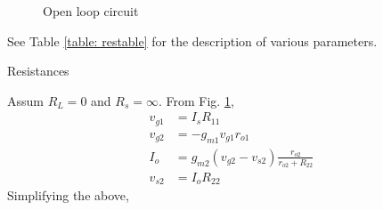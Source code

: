\begin{enumerate}[label=\arabic*.,ref=\theenumi]
\begin{figure}[!ht]
\begin{center}
		\resizebox{\columnwidth}{!}{}
	\end{center}
\caption{Open loop circuit}
\label{fig:ee18btech11038_Ackt}
\end{figure}
\solution See Table \ref{table: restable} for the description of various parameters.
%
\begin{table}[!ht]
\centering

\caption{Resistances}
\label{table: restable}
\end{table}
%
Assum $R_{L} = 0$ and $R_{s} = \infty$. 
From Fig. \ref{fig:ee18btech11038_Ackt}, 
\begin{align}
\label{eq:ee18btech11038_VG2}
    v_{g1} &= I_{s}R_{11} 
\\
    v_{g2} &= -g_{m1}v_{g1}r_{o1}
\label{eq:ee18btech11038_VG@}
\\
I_o &=  g_{m2}(v_{g2} - v_{s2}) \frac{r_{o2}}{r_{o2}+R_{22}}
\\
v_{s2} &= I_o R_{22}
\end{align}
%
Simplifying the above, 

\end{enumerate}
